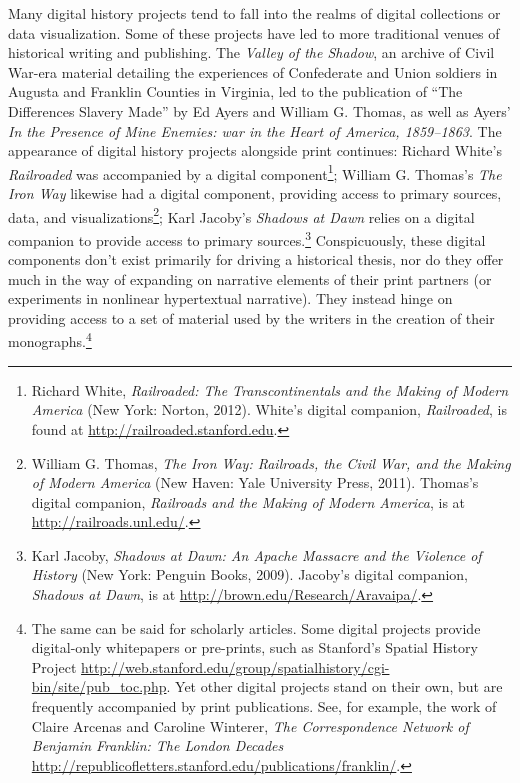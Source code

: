 \documentclass[11pt,]{article}
\begin{document}
Many digital history projects tend to fall into the realms of digital
collections or data visualization. Some of these projects have led to
more traditional venues of historical writing and publishing. The
\emph{Valley of the Shadow}, an archive of Civil War-era material
detailing the experiences of Confederate and Union soldiers in Augusta
and Franklin Counties in Virginia, led to the publication of ``The
Differences Slavery Made'' by Ed Ayers and William G. Thomas, as well as
Ayers' \emph{In the Presence of Mine Enemies: war in the Heart of
America, 1859--1863}. The appearance of digital history projects
alongside print continues: Richard White's \emph{Railroaded} was
accompanied by a digital component\footnote{Richard White,
  \emph{Railroaded: The Transcontinentals and the Making of Modern
  America} (New York: Norton, 2012). White's digital companion,
  \emph{Railroaded}, is found at \url{http://railroaded.stanford.edu}.};
William G. Thomas's \emph{The Iron Way} likewise had a digital
component, providing access to primary sources, data, and
visualizations\footnote{William G. Thomas, \emph{The Iron Way:
  Railroads, the Civil War, and the Making of Modern America} (New
  Haven: Yale University Press, 2011). Thomas's digital companion,
  \emph{Railroads and the Making of Modern America}, is at
  \url{http://railroads.unl.edu/}.}; Karl Jacoby's \emph{Shadows at
Dawn} relies on a digital companion to provide access to primary
sources.\footnote{Karl Jacoby, \emph{Shadows at Dawn: An Apache Massacre
  and the Violence of History} (New York: Penguin Books, 2009). Jacoby's
  digital companion, \emph{Shadows at Dawn}, is at
  \url{http://brown.edu/Research/Aravaipa/}.} Conspicuously, these
digital components don't exist primarily for driving a historical
thesis, nor do they offer much in the way of expanding on narrative
elements of their print partners (or experiments in nonlinear
hypertextual narrative). They instead hinge on providing access to a set
of material used by the writers in the creation of their
monographs.\footnote{The same can be said for scholarly articles. Some
  digital projects provide digital-only whitepapers or pre-prints, such
  as Stanford's Spatial History Project
  \url{http://web.stanford.edu/group/spatialhistory/cgi-bin/site/pub_toc.php}.
  Yet other digital projects stand on their own, but are frequently
  accompanied by print publications. See, for example, the work of
  Claire Arcenas and Caroline Winterer, \emph{The Correspondence Network
  of Benjamin Franklin: The London Decades}
  \url{http://republicofletters.stanford.edu/publications/franklin/}.}
\end{document}
